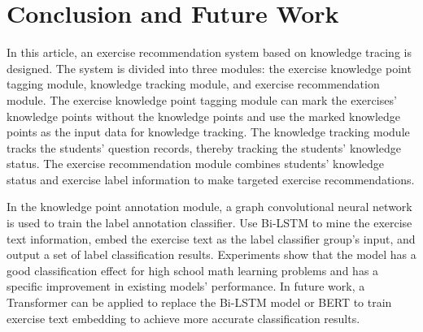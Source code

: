 \chapter{Conclusion and Future Work}

In this article, an exercise recommendation system based on knowledge tracing is designed. The system is divided into three modules: the exercise knowledge point tagging module, knowledge tracking module, and exercise recommendation module. The exercise knowledge point tagging module can mark the exercises' knowledge points without the knowledge points and use the marked knowledge points as the input data for knowledge tracking. The knowledge tracking module tracks the students' question records, thereby tracking the students' knowledge status. The exercise recommendation module combines students' knowledge status and exercise label information to make targeted exercise recommendations.


In the knowledge point annotation module, a graph convolutional neural network is used to train the label annotation classifier. Use Bi-LSTM to mine the exercise text information, embed the exercise text as the label classifier group's input, and output a set of label classification results. Experiments show that the model has a good classification effect for high school math learning problems and has a specific improvement in existing models' performance. In future work, a Transformer can be applied to replace the Bi-LSTM model or BERT to train exercise text embedding to achieve more accurate classification results.


